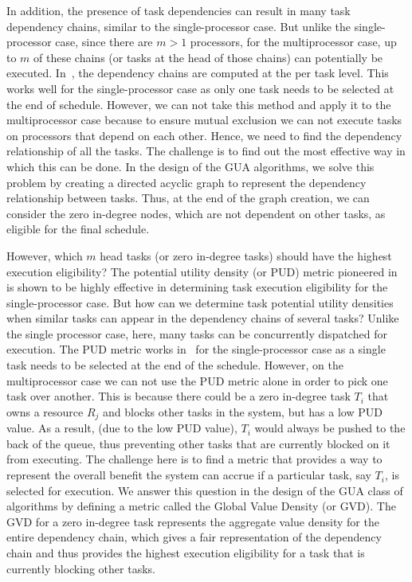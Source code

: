 \documentclass[12pt,dvips]{report}
\begin{document}
In addition, the presence of task dependencies can result in many task dependency chains, similar to the single-processor case. But unlike the single-processor case, since there are $m > 1$ processors, for the multiprocessor case, up to $m$ of these chains (or tasks at the head of those chains) can potentially be executed. In~\cite{DASA}, the dependency chains are computed at the per task level. This works well for the single-processor case as only one task needs to be selected at the end of schedule. However, we can not take this method and apply it to the multiprocessor case because to ensure mutual exclusion we can not execute tasks on processors that depend on each other. Hence, we need to find the dependency relationship of all the tasks. The challenge is to find out the most effective way in which this can be done. In the design of the GUA algorithms, we solve this problem by creating a directed acyclic graph to represent the dependency relationship between tasks. Thus, at the end of the graph creation, we can consider the zero in-degree nodes, which are not dependent on other tasks, as eligible for the final schedule.

However, which $m$ head tasks (or zero in-degree tasks) should have the highest execution eligibility? The potential utility density (or PUD) metric pioneered in~\cite{DASA} is shown to be highly effective in determining task execution eligibility for the single-processor case. But how can we determine task potential utility densities when similar tasks can appear in the dependency chains of several tasks? Unlike the single processor case, here, many tasks can be concurrently dispatched for execution. The PUD metric works in~\cite{DASA} for the single-processor case as a single task needs to be selected at the end of the schedule. However, on the multiprocessor case we can not use the PUD metric alone in order to pick one task over another. This is because there could be a zero in-degree task $T_i$ that owns a resource $R_j$ and blocks other tasks in the system, but has a low PUD value. As a result, (due to the low PUD value), $T_i$ would always be pushed to the back of the queue, thus preventing other tasks that are currently blocked on it from executing. The challenge here is to find a metric that provides a way to represent the overall benefit the system can accrue if a particular task, say $T_i$, is selected for execution. We answer this question in the design of the GUA class of algorithms by defining a metric called the Global Value Density (or GVD). The GVD for a zero in-degree task represents the aggregate value density for the entire dependency chain, which gives a fair representation of the dependency chain and thus provides the highest execution eligibility for a task that is currently blocking other tasks.
\end{document}
